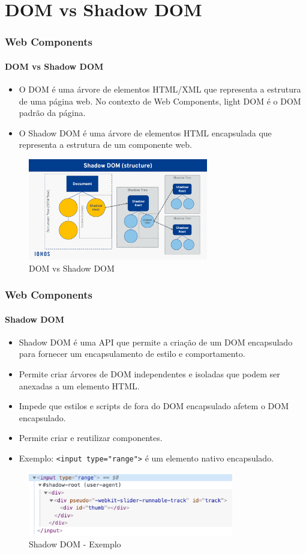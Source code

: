 \documentclass[
	9pt, %
	t, %
]{beamer}
\begin{document}
\section{DOM vs Shadow DOM}

\begin{frame}
	\frametitle{Web Components}
	\framesubtitle{DOM vs Shadow DOM}
	\begin{itemize}
		\item O DOM é uma árvore de elementos HTML/XML que representa a estrutura de uma página web. No contexto de Web Components, light DOM é o DOM padrão da página.
		\item O Shadow DOM é uma árvore de elementos HTML encapsulada que representa a estrutura de um componente web.
	\end{itemize}

	\begin{figure}
		\centering
		\includegraphics[width=0.7\textwidth]{dom_shadow_dom.png}
		\caption{DOM vs Shadow DOM}
	\end{figure}

\end{frame}

\begin{frame}
	\frametitle{Web Components}
	\framesubtitle{Shadow DOM}
	\begin{itemize}
		\item Shadow DOM é uma API que permite a criação de um DOM encapsulado para fornecer um encapsulamento de estilo e comportamento.
		\item Permite criar árvores de DOM independentes e isoladas que podem ser anexadas a um elemento HTML.
		\item Impede que estilos e scripts de fora do DOM encapsulado afetem o DOM encapsulado.
		\item Permite criar e reutilizar componentes.
		\item Exemplo: \texttt{<input type="range">} é um elemento nativo encapsulado.
	\end{itemize}

	\begin{figure}
		\centering
		\includegraphics[width=0.8\textwidth]{shadow_dom_example.png}
		\caption{Shadow DOM - Exemplo}
	\end{figure}

\end{frame}
\end{document}

